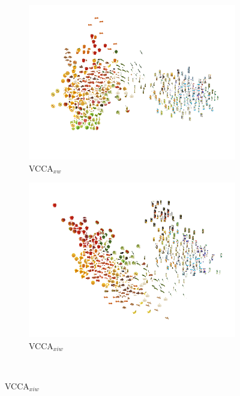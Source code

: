 \begin{figure}[t]
\begin{subfigure}[b]{0.3\textwidth}
     \end{subfigure} 
     \begin{subfigure}[b]{0.3\textwidth}
         \centering
         \includegraphics[width=\textwidth]{PaperB/figures_and_tables/latent_space_visualizations/pca_latents_vcca_xw_seed2.png}
         \caption{VCCA$_{x w}$}
         \label{fig:pca_vcca_xw}
     \end{subfigure} 
     \begin{subfigure}[b]{0.3\textwidth}
         \centering
         \includegraphics[width=\textwidth]{PaperB/figures_and_tables/latent_space_visualizations/pca_latents_vcca_xiw_seed2.png}
         \caption{VCCA$_{x i w}$}
         \label{fig:pca_vcca_xiw}
     \end{subfigure} \\

\end{figure}
